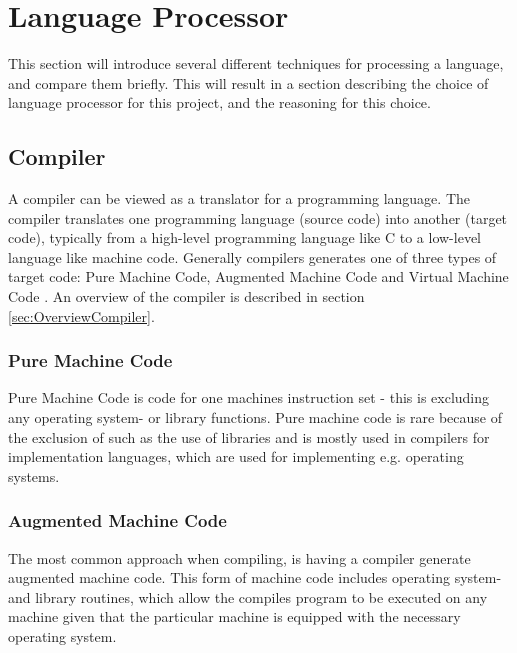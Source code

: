 \section{Language Processor}
This section will introduce several different techniques for processing a language, and compare them briefly. This will result in a section describing the choice of language processor for this project, and the reasoning for this choice.

\subsection{Compiler}
A compiler can be viewed as a translator for a programming language. The compiler translates one programming language (source code) into another (target code), typically from a high-level programming language like C to a low-level language like machine code. Generally compilers generates one of three types of target code: Pure Machine Code, Augmented Machine Code and Virtual Machine Code \citep{CraftingACompiler}. An overview of the compiler is described in section \ref{sec:OverviewCompiler}.

\subsubsection*{Pure Machine Code} 
Pure Machine Code is code for one machines instruction set - this is excluding any operating system- or library functions. Pure machine code is rare because of the exclusion of such as the use of libraries and is mostly used in compilers for implementation languages, which are used for implementing e.g. operating systems.
 
\subsubsection*{Augmented Machine Code}
The most common approach when compiling, is having a compiler generate augmented machine code. This form of machine code includes operating system- and library routines, which allow the compiles program to be executed on any machine given that the particular machine is equipped with the necessary operating system.

